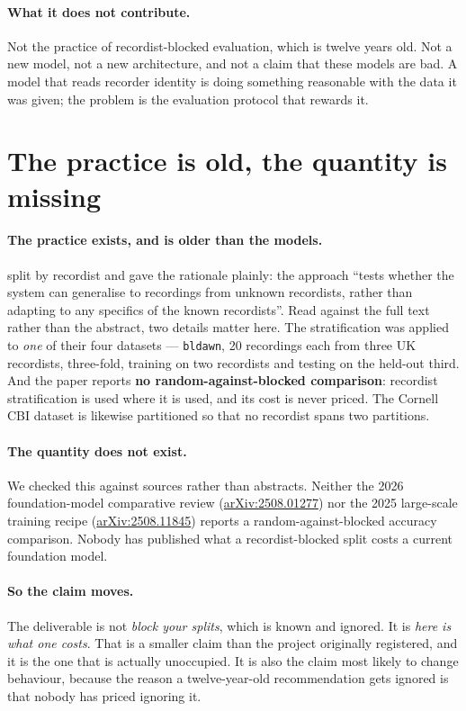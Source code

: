 \documentclass[10pt,twocolumn,a4paper]{article}
\begin{document}
\paragraph{What it does not contribute.} Not the practice of recordist-blocked evaluation,
which is twelve years old. Not a new model, not a new architecture, and not a claim that
these models are bad. A model that reads recorder identity is doing something reasonable
with the data it was given; the problem is the evaluation protocol that rewards it.

\section{The practice is old, the quantity is missing}
\label{sec:related}

\paragraph{The practice exists, and is older than the models.} \citet{stowell2014} split by
recordist and gave the rationale plainly: the approach ``tests whether the system can
generalise to recordings from unknown recordists, rather than adapting to any specifics of
the known recordists''. Read against the full text rather than the abstract, two details
matter here. The stratification was applied to \emph{one} of their four datasets ---
\texttt{bldawn}, 20 recordings each from three UK recordists, three-fold, training on two
recordists and testing on the held-out third. And the paper reports \textbf{no
random-against-blocked comparison}: recordist stratification is used where it is used, and
its cost is never priced. The Cornell CBI dataset is likewise partitioned so that no
recordist spans two partitions.

\paragraph{The quantity does not exist.} We checked this against sources rather than
abstracts. Neither the 2026 foundation-model comparative review
(\href{https://arxiv.org/abs/2508.01277}{arXiv:2508.01277}) nor the 2025 large-scale training
recipe (\href{https://arxiv.org/abs/2508.11845}{arXiv:2508.11845}) reports a
random-against-blocked accuracy comparison. Nobody has published what a recordist-blocked
split costs a current foundation model.

\paragraph{So the claim moves.} The deliverable is not \emph{block your splits}, which is
known and ignored. It is \emph{here is what one costs}. That is a smaller claim than the
project originally registered, and it is the one that is actually unoccupied. It is also the
claim most likely to change behaviour, because the reason a twelve-year-old
recommendation gets ignored is that nobody has priced ignoring it.
\end{document}
